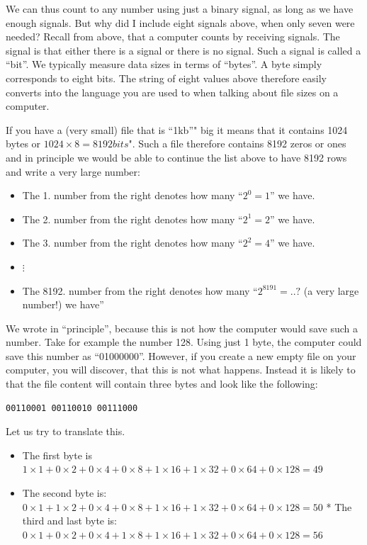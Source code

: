 \documentclass[]{book}
\providecommand{\tightlist}{%
  \setlength{\itemsep}{0pt}\setlength{\parskip}{0pt}}
\begin{document}
We can thus count to any number using just a binary signal, as long as we have enough signals. But why did I include eight signals above, when only seven were needed? Recall from above, that a computer counts by receiving signals. The signal is that either there is a signal or there is no signal. Such a signal is called a ``bit''. We typically measure data sizes in terms of ``bytes''. A byte simply corresponds to eight bits. The string of eight values above therefore easily converts into the language you are used to when talking about file sizes on a computer.

If you have a (very small) file that is ``1kb''" big it means that it contains 1024 bytes or \(1024\times 8= 8192 bits\)". Such a file therefore contains 8192 zeros or ones and in principle we would be able to continue the list above to have 8192 rows and write a very large number:

\begin{itemize}
\tightlist
\item
  The 1. number from the right denotes how many ``\(2^0=1\)'' we have.
\item
  The 2. number from the right denotes how many ``\(2^1=2\)'' we have.
\item
  The 3. number from the right denotes how many ``\(2^2=4\)'' we have.
\item
  \(\vdots\)
\item
  The 8192. number from the right denotes how many ``\(2^{8191}=..?\) (a very large number!) we have''
\end{itemize}

We wrote in ``principle'', because this is not how the computer would save such a number. Take for example the number 128. Using just 1 byte, the computer could save this number as ``01000000''. However, if you create a new empty file on your computer, you will discover, that this is not what happens. Instead it is likely to that the file content will contain three bytes and look like the following:

\begin{verbatim}
00110001 00110010 00111000
\end{verbatim}

Let us try to translate this.

\begin{itemize}
\tightlist
\item
  The first byte is \(1 \times 1+0\times 2+0\times 4 +0\times 8 +1\times 16 +1\times 32 +0\times 64 +0\times 128=49\)
\item
  The second byte is: \(0 \times 1+1\times 2+0\times 4 +0\times 8 +1\times 16 +1\times 32 +0\times 64 +0\times 128=50\) * The third and last byte is: \(0 \times 1+0\times 2+0\times 4 +1\times 8 +1\times 16 +1\times 32 +0\times 64 +0\times 128=56\)
\end{itemize}
\end{document}
